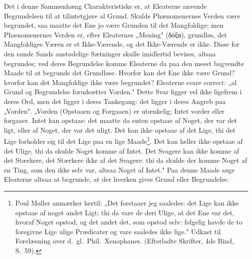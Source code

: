 \documentclass[12pt]{book}
\newcommand{\opage}[1]{\marginnote{\footnotesize\textit{[#1]}}}
\begin{document}
Det i denne Sammenhæng Charakteristiske er, at Eleaterne anvende Begrundelsen til at
tilintetgjøre al Grund. Skulde Phænomenernes Verden være begrundet, saa maatte det
Ene jo være Grunden til det Mangfoldige; men Phænomenernes Verden er, efter
Eleaternes „Mening" (δόξα), grundløs, det Mangfoldiges Væren er et Ikke-Værende, og
det Ikke-Værende er ikke. Disse for den sunde Sands anstødelige Sætninger skulle
imidlertid bevises, altsaa begrundes; ved deres Begrundelse komme Eleaterne da paa den
meest bagvendte Maade til at begrunde det Grundløse. Hvorfor kan det Ene ikke være
Grund? hvorfor kan det Mangfoldige ikke være begrundet? Eleaterne svare correct: „al
Grund og Begrundelse forudsætter Vorden." Dette Svar ligger vel ikke ligefrem i deres
Ord, men det ligger i deres Tankegang: det ligger i deres Angreb paa „Vorden".
„Vorden (Opstaaen og Forgaaen) er utænkelig; Intet vorder eller forgaaer. Intet kan
opstaae: det maatte da enten opstaae af Noget, der var det ligt, eller af Noget, der
var det uligt. Det kan ikke opstaae af det Lige, thi det Lige forholder sig til det
Lige paa en lige Maade\footnote{Poul Møller anmærker hertil: „Det forstaaer jeg
saaledes: det Lige kan ikke opstaae af noget andet Ligt; thi da vare de deri Ulige, at
det Ene var det, hvoraf Noget opstod, og det andet det, som opstod selv: følgelig
havde de to foregivne Lige ulige Prædicater og vare saaledes ikke lige." Udkast til
Forelæsning over d.\ gl.\ Phil.\ Xenophanes. (Efterladte Skrifter, 4de Bind, S.~59).}.
Det kan heller ikke opstaae af det Ulige, thi da skulde Noget komme af Intet. Det
Svagere kan ikke komme af det Stærkere, det Stærkere ikke af det Svagere: thi da
skulde der komme Noget af en Ting, som den ikke selv var, altsaa Noget af Intet." Paa
denne Maade søge
\opage{95} Eleaterne altsaa at begrunde, at der hverken gives Grund eller Begrundelse.
\end{document}
